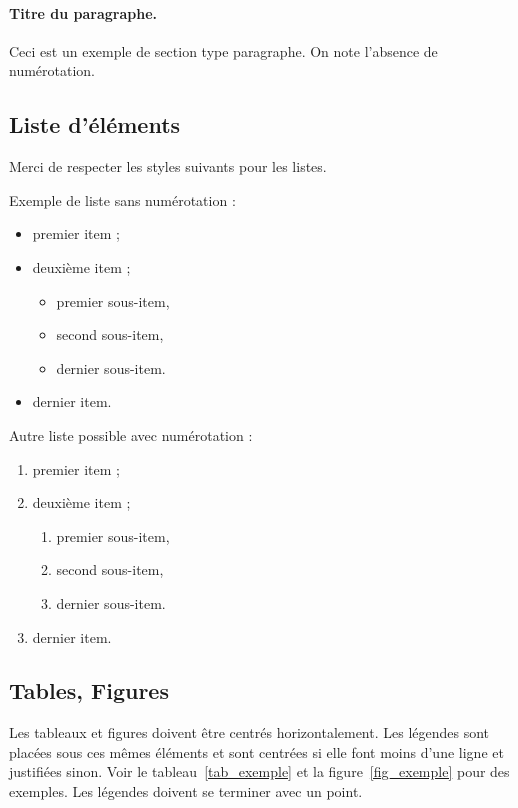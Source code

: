 \documentclass[a4paper,pagenum,french,showlayout]{rnti}
\begin{document}
\paragraph{Titre du paragraphe.} Ceci est un exemple de section type
paragraphe. On note l'absence de numérotation.

\subsection{Liste d'éléments}

Merci de respecter les styles suivants pour les listes.

Exemple de liste sans numérotation :
\begin{itemize}
    \item premier item ;
    \item deuxième item ;
    \begin{itemize}
      \item premier sous-item,
      \item second sous-item,
      \item dernier sous-item.
  \end{itemize}
  \item dernier item.
\end{itemize}

Autre liste possible avec numérotation :
\begin{enumerate}
    \item premier item ;
    \item deuxième item ;
    \begin{enumerate}
      \item premier sous-item,
      \item second sous-item,
      \item dernier sous-item.
    \end{enumerate}
  \item dernier item.
\end{enumerate}

\subsection{Tables, Figures}


Les tableaux et figures doivent être centrés horizontalement. Les
légendes sont placées sous ces mêmes éléments et sont centrées si
elle font moins d'une ligne et justifiées sinon. Voir le
tableau~\ref{tab_exemple} et la figure~\ref{fig_exemple} pour des
exemples. Les légendes doivent se terminer avec un point.
\end{document}
